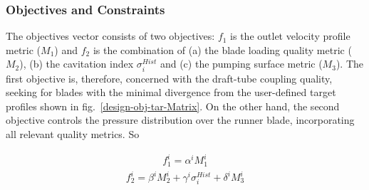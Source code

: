 
\subsubsection{Objectives and Constraints}

The objectives vector consists of two objectives: $f_1$ is the outlet velocity profile metric ($M_1$) and $f_2$ is the combination of (a) the blade loading quality metric ($M_2$), (b) the cavitation index $\sigma_i^{Hist}$ and (c) the pumping surface metric ($M_3$). The first objective is, therefore, concerned with the draft-tube coupling quality, seeking for blades with the minimal divergence from the user-defined target profiles shown in fig.\ \ref{design-obj-tar-Matrix}. On the other hand, the second objective controls the pressure distribution over the runner blade, incorporating all relevant quality metrics. So

\begin{eqnarray}
f_1^i= \alpha ^i M_1^i
   \label{ObjM} 
\end{eqnarray}
\begin{eqnarray}
\nonumber
f_2^i =\beta ^i M_2^i +\gamma ^i \sigma_i^{Hist} +\delta ^i M_3^i
   \label{ObjM} 
\end{eqnarray}


